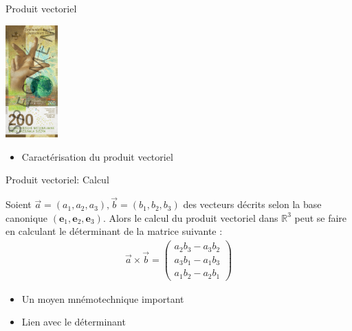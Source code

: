 \documentclass[xcolor=table]{beamer}
\begin{document}
\begin{frame}{Produit vectoriel}
\begin{center}
%
\includegraphics[width=0.15\textwidth]{Images/billet_200.jpg}
\end{center}
\begin{itemize}
    \item Caractérisation du produit vectoriel

\end{itemize}
\end{frame}

\begin{frame}{Produit vectoriel: Calcul}
\begin{tcolorbox}[title = Calcul du produit vectoriel, enlarge top by=1mm, enlarge bottom by=1mm]
Soient $\Vec{a}=(a_1,a_2,a_3),\Vec{b}=(b_1,b_2,b_3)$ des vecteurs décrits selon la base canonique $(\mathbf{e}_1,\mathbf{e}_2,\mathbf{e}_3).$ Alors le calcul du produit vectoriel dans $\mathbb{R}^3$ peut se faire en calculant le déterminant de la matrice suivante :\begin{align*}
    \vec{a} \times \vec{b} =\begin{pmatrix}
a_2 b_3 - a_3 b_2 \\
a_3 b_1 - a_1 b_3 \\
a_1 b_2 - a_2 b_1
\end{pmatrix}
\end{align*}

 
\end{tcolorbox}
    \begin{itemize}
    \item Un moyen mnémotechnique important
    \item Lien avec le déterminant
\end{itemize}
\end{frame}
\end{document}
